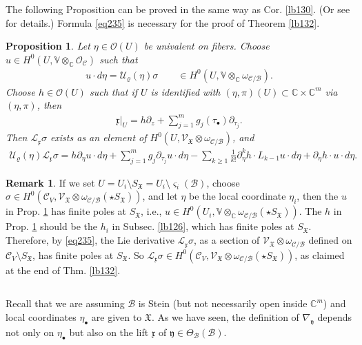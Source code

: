 \documentclass[11pt,b5paper,notitlepage]{article}
\theoremstyle{definition}
\newtheorem{rem}[df]{Remark}
\theoremstyle{plain}
\newtheorem{pp}[df]{Proposition}
\newcommand{\fk}{\mathfrak}
\newcommand{\mc}{\mathcal}
\newcommand{\scr}{\mathscr}
\newcommand{\xk}{\mathfrak x}
\newcommand{\yk}{\mathfrak y}
\newcommand{\sgm}{\varsigma}
\newcommand{\SX}{{S_{\fk X}}}
\newcommand{\blt}{\bullet}
\newcommand{\Vbb}{\mathbb V}
\newcommand{\Cbb}{\mathbb C}
\numberwithin{equation}{section}
\begin{document}
The following Proposition can be proved in the same way as Cor. \ref{lb130}. (Or see \cite[Sec. 2.6]{Gui} for details.) Formula \eqref{eq235} is necessary for the proof of Theorem \ref{lb132}.
\begin{pp}\label{lb131}
Let $\eta\in\scr O(U)$ be univalent on fibers. Choose $u\in H^0(U,\Vbb\otimes_\Cbb\scr O_{\mc C})$ such that
\begin{align*}
u\cdot d\eta=\mc U_\varrho(\eta)\sigma\qquad\in H^0(U,\Vbb\otimes_\Cbb\omega_{\mc C/\mc B}).
\end{align*}
Choose $h\in\scr O(U)$ such that if $U$ is identified with $(\eta,\pi)(U)\subset\Cbb\times\Cbb^m$ via $(\eta,\pi)$, then 
\begin{align*}
\xk|_U=h\partial_z+\sum_{j=1}^mg_j(\tau_\blt)\partial_{\tau_j}.
\end{align*}
Then $\mc L_\xk\sigma$ exists as an element of $H^0(U,\scr V_{\fk X}\otimes\omega_{\mc C/\mc B})$, and
\begin{align}
\mc U_\varrho(\eta)\mc L_\xk\sigma=h\partial_\eta u\cdot d\eta+\sum_{j=1}^m g_j\partial_{\tau_j}u\cdot d\eta-\sum_{k\geq1} \frac 1{k!}\partial_\eta^k h\cdot L_{k-1}u\cdot d\eta+\partial_\eta h\cdot u\cdot d\eta.\label{eq235}
\end{align}
\end{pp}

\begin{rem}
If we set $U=U_i\setminus\SX=U_i\setminus\sgm_i(\mc B)$, choose $\sigma\in H^0(\mc C_V,\scr V_{\fk X}\otimes\omega_{\mc C/\mc B}(\star\SX))$, and let $\eta$ be the local coordinate $\eta_i$, then the $u$ in Prop. \ref{lb131} has finite poles at $\SX$, i.e., $u\in H^0(U_i,\Vbb\otimes_\Cbb\omega_{\mc C/\mc B}(\star\SX))$. The $h$ in Prop. \ref{lb131} should be the $h_i$ in Subsec. \ref{lb126}, which has finite poles at $\SX$. Therefore, by \eqref{eq235},  the Lie derivative $\mc L_\xk\sigma$, as a section of $\scr V_{\fk X}\otimes\omega_{\mc C/\mc B}$ defined on $\mc C_V\setminus\SX$, has finite poles at $\SX$. So $\mc L_\xk\sigma\in H^0(\mc C_V,\scr V_{\fk X}\otimes\omega_{\mc C/\mc B}(\star\SX))$, as claimed at the end of Thm. \ref{lb132}.
\end{rem}
 

\subsection{}

Recall that we are assuming $\mc B$ is Stein (but not necessarily open inside $\Cbb^m$) and local coordinates $\eta_\blt$ are given to $\fk X$. As we have seen, the definition of $\nabla_\yk$ depends not only on $\eta_\blt$ but also on the lift $\xk$ of $\yk\in\Theta_{\mc B}(\mc B)$.
\end{document}
